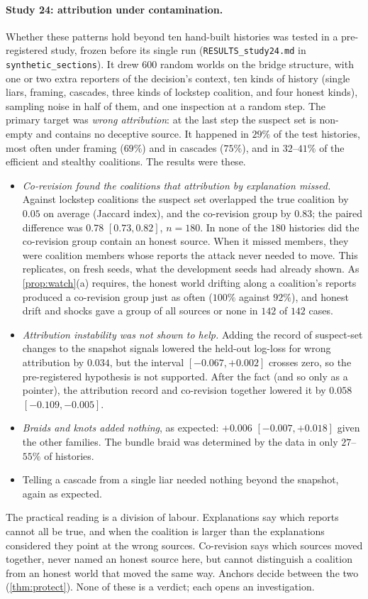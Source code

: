 \documentclass[11pt]{article}
\theoremstyle{definition}\newtheorem{definition}[theorem]{Definition}\newtheorem{remark}[theorem]{Remark}\newtheorem{example}[theorem]{Example}\newtheorem{problem}[theorem]{Open problem}\crefname{problem}{Problem}{Problems}
\begin{document}
\paragraph{Study 24: attribution under contamination.} Whether these patterns hold beyond ten hand-built histories was tested in a pre-registered study, frozen before its single run (\texttt{RESULTS\_study24.md} in \texttt{synthetic\_sections}). It drew $600$ random worlds on the bridge structure, with one or two extra reporters of the decision's context, ten kinds of history (single liars, framing, cascades, three kinds of lockstep coalition, and four honest kinds), sampling noise in half of them, and one inspection at a random step. The primary target was \emph{wrong attribution}: at the last step the suspect set is non-empty and contains no deceptive source. It happened in $29\%$ of the test histories, most often under framing ($69\%$) and in cascades ($75\%$), and in $32$--$41\%$ of the efficient and stealthy coalitions. The results were these.
\begin{itemize}
\item \emph{Co-revision found the coalitions that attribution by explanation missed.} Against lockstep coalitions the suspect set overlapped the true coalition by $0.05$ on average (Jaccard index), and the co-revision group by $0.83$; the paired difference was $0.78$ $[0.73,0.82]$, $n=180$. In none of the $180$ histories did the co-revision group contain an honest source. When it missed members, they were coalition members whose reports the attack never needed to move. This replicates, on fresh seeds, what the development seeds had already shown. As \cref{prop:watch}(a) requires, the honest world drifting along a coalition's reports produced a co-revision group just as often ($100\%$ against $92\%$), and honest drift and shocks gave a group of all sources or none in $142$ of $142$ cases.
\item \emph{Attribution instability was not shown to help.} Adding the record of suspect-set changes to the snapshot signals lowered the held-out log-loss for wrong attribution by $0.034$, but the interval $[-0.067,+0.002]$ crosses zero, so the pre-registered hypothesis is not supported. After the fact (and so only as a pointer), the attribution record and co-revision together lowered it by $0.058$ $[-0.109,-0.005]$.
\item \emph{Braids and knots added nothing}, as expected: $+0.006$ $[-0.007,+0.018]$ given the other families. The bundle braid was determined by the data in only $27$--$55\%$ of histories.
\item Telling a cascade from a single liar needed nothing beyond the snapshot, again as expected.
\end{itemize}
The practical reading is a division of labour. Explanations say which reports cannot all be true, and when the coalition is larger than the explanations considered they point at the wrong sources. Co-revision says which sources moved together, never named an honest source here, but cannot distinguish a coalition from an honest world that moved the same way. Anchors decide between the two (\cref{thm:protect}). None of these is a verdict; each opens an investigation.
\end{document}

